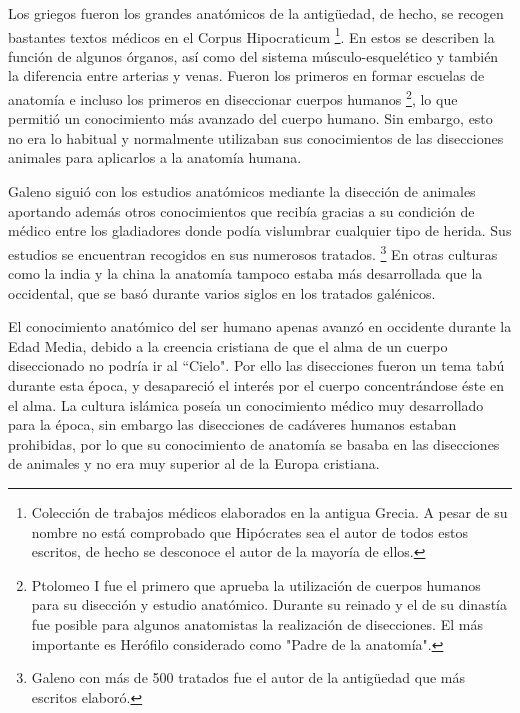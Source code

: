 Los griegos fueron los grandes anatómicos de la antigüedad, de hecho, se recogen bastantes textos médicos en el Corpus Hipocraticum \footnote{Colección de trabajos médicos elaborados en la antigua Grecia. A pesar de su nombre no está comprobado que Hipócrates sea el autor de todos estos escritos, de hecho se desconoce el autor de la mayoría de ellos.}. En estos se describen la función de algunos órganos, así como del sistema músculo-esquelético y también la diferencia entre arterias y venas. Fueron los primeros en formar escuelas de anatomía e incluso los primeros en diseccionar cuerpos humanos \footnote{Ptolomeo I fue el primero que aprueba la utilización de cuerpos humanos para su disección y estudio anatómico. Durante su reinado y el de su dinastía fue posible para algunos anatomistas la realización de disecciones. El más importante es Herófilo considerado como "Padre de la anatomía".}, lo que permitió un conocimiento más avanzado del cuerpo humano. Sin embargo, esto no era lo habitual y normalmente utilizaban sus conocimientos de las disecciones animales para aplicarlos a la anatomía humana.

Galeno siguió con los estudios anatómicos mediante la disección de animales aportando además otros conocimientos que recibía gracias a su condición de médico entre los gladiadores donde podía vislumbrar cualquier tipo de herida. Sus estudios se encuentran recogidos en sus numerosos tratados. \footnote{Galeno con más de 500 tratados fue el autor de la antigüedad que más escritos elaboró.} En otras culturas como la india y la china la anatomía tampoco estaba más desarrollada que la occidental, que se basó durante varios siglos en los tratados galénicos.

El conocimiento anatómico del ser humano apenas avanzó en occidente durante la Edad Media, debido a la creencia cristiana de que el alma de un cuerpo diseccionado no podría ir al ``Cielo". Por ello las disecciones fueron un tema tabú durante esta época, y desapareció el interés por el cuerpo concentrándose éste en el alma. La cultura islámica poseía un conocimiento médico muy desarrollado para la época, sin embargo las disecciones de cadáveres humanos estaban prohibidas, por lo que su conocimiento de anatomía se basaba en las disecciones de animales y no era muy superior al de la Europa cristiana.


